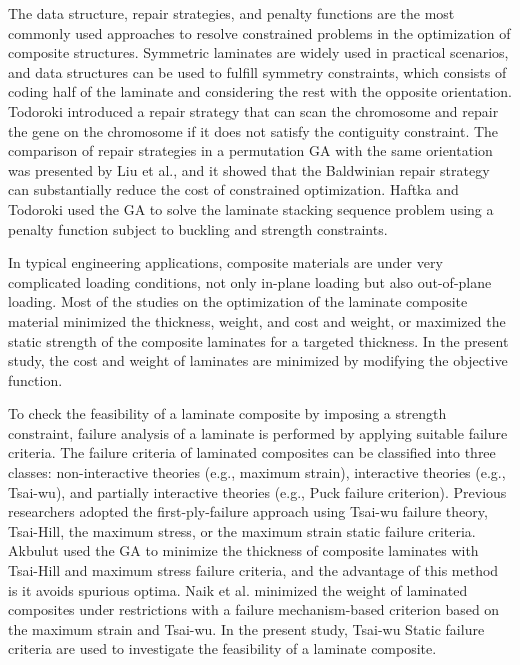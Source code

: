 \documentclass[10pt, journal]{IEEEtran}
\begin{document}
The data structure, repair strategies, and penalty functions\cite{le1995improved} are the most commonly used
approaches to resolve constrained problems in the optimization of composite structures. Symmetric
laminates are widely used in practical scenarios, and data structures can be used to fulfill symmetry
constraints, which consists of coding half of the laminate and considering the rest with the
opposite orientation. Todoroki\cite{todoroki1998stacking} introduced a repair strategy that can scan the chromosome and
repair the gene on the chromosome if it does not satisfy the contiguity constraint. The comparison of
repair strategies in a permutation GA with the same orientation was presented by Liu et al.\cite{liu2000permutation}, and it
showed that the Baldwinian repair strategy can substantially reduce the cost of constrained optimization.
Haftka and Todoroki\cite{riche1993optimization} used the GA to solve the laminate stacking sequence problem using a penalty function subject to
buckling and strength constraints.

In typical engineering applications, composite materials are under very complicated loading
conditions, not only in-plane loading but also out-of-plane loading. Most of the studies on the
optimization of the laminate composite material minimized the
thickness\cite{abu1998optimum,walker2003technique},
weight\cite{fang1993design,deka2005multiobjective,park2008improved}, and cost and
weight\cite{deka2005multiobjective,omkar2008artificial}, or maximized the static strength of
the composite laminates for a targeted
thickness\cite{walker2003technique,lin2004stacking,kim2007development,gholami2020multi}. 
In the present study,
the cost and weight of laminates are minimized by modifying the objective function.

To check the feasibility of a laminate composite by imposing a strength constraint, failure
analysis of a laminate is performed by applying suitable failure criteria. The failure criteria of
laminated composites can be classified into three classes: non-interactive theories (e.g., maximum
strain), interactive theories (e.g., Tsai-wu), and partially interactive theories (e.g., Puck failure
criterion). Previous researchers adopted the first-ply-failure approach using Tsai-wu
failure
theory\cite{massard1984computer,reddy1987first,fang1993design,soeiro1994multilevel,pelletier2006multi,jadhav2007parametric,omkar2008artificial,choudhury2019failure},
Tsai-Hill\cite{martin1987optimum,soares1995discrete}, the maximum stress\cite{watkins1987multicriteria}, or the maximum strain\cite{watkins1987multicriteria}
static failure criteria. Akbulut\cite{akbulut2008optimum} used the GA to minimize the thickness of composite laminates with
Tsai-Hill and maximum stress failure criteria, and the advantage of this method is it avoids spurious
optima. Naik et al.\cite{naik2008design}
minimized the weight of laminated composites under restrictions with a
failure mechanism-based criterion based on the maximum strain and Tsai-wu. In the present study, Tsai-wu
Static failure criteria are used to investigate the feasibility of a laminate composite.
\end{document}
